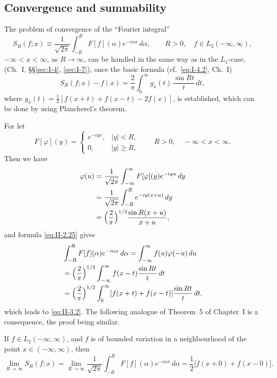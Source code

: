 \subsection*{Convergence and summability}
\noindent The problem of convergence of the ``Fourier integral''
\begin{equation}\tag{3.1}\label{eq:II-3.1}
S_{R}(f;x)\equiv \frac{1}{\sqrt{2\pi}}\int_{-R}^{R}F[f](\alpha)e^{-i\alpha x}\,d\alpha,\qquad R>0,\quad f\in L_{2}(-\infty,\infty),
\end{equation}
$-\infty<x<\infty$, as $R\to\infty$, can be handled in the same way as in the $L_{1}$-case, (Ch.~I, \S\S\ref{sec:I-4}, \ref{sec:I-7}), once the basic formula (cf.\ \eqref{eq:I-4.2}, Ch.~I)
\begin{equation}\tag{3.2}\label{eq:II-3.2}
S_{R}(f;x)-f(x)=\frac{2}{\pi}\int_{0}^{\infty}g_{x}(t)\,\frac{\sin Rt}{t}\,dt,
\end{equation}
where $g_{x}(t)=\frac{1}{2}[f(x+t)+f(x-t)-2f(x)]$, is established, which can be done by using Plancherel's theorem.

For let
\[
F[\varphi](y)=
\begin{cases}
e^{-iyx}, & |y|<R,\\
0, & |y|\ge R,
\end{cases}
\qquad R>0,\quad -\infty<x<\infty.
\]
Then we have
\[
\begin{aligned}
\varphi(u) &= \frac{1}{\sqrt{2\pi}}\int_{-\infty}^{\infty}F[\varphi](y)e^{-iyu}\,dy\\
&= \frac{1}{\sqrt{2\pi}}\int_{-R}^{R}e^{-iy(x+u)}\,dy\\
&= \Bigl(\frac{2}{\pi}\Bigr)^{1/2}\frac{\sin R(x+u)}{x+u},
\end{aligned}
\]
and formula \eqref{eq:II-2.25} gives
\[
\begin{aligned}
&\int_{-R}^{R}F[f](\alpha)e^{-i\alpha x}\,d\alpha = \int_{-\infty}^{\infty}f(u)\varphi(-u)\,du\\
&= \Bigl(\frac{2}{\pi}\Bigr)^{1/2}\int_{-\infty}^{\infty}f(x-t)\frac{\sin Rt}{t}\,dt\\
&= \Bigl(\frac{2}{\pi}\Bigr)^{1/2}\int_{0}^{\infty}[f(x+t)+f(x-t)]\frac{\sin Rt}{t}\,dt,
\end{aligned}
\]
which leads to \eqref{eq:II-3.2}. The following analogue of Theorem~5 of Chapter~I is a consequence, the proof being similar.

\begin{theorem}\label{thm:II-2}
If $f\in L_{2}(-\infty,\infty)$, and $f$ is of bounded variation in a neighbourhood of the point $x\in(-\infty,\infty)$, then
\[
\lim_{R\to\infty}S_{R}(f;x)
=\lim_{R\to\infty}\frac{1}{\sqrt{2\pi}}\int_{-R}^{R}F[f](\alpha)e^{-i\alpha x}\,d\alpha
=\frac{1}{2}\bigl[f(x+0)+f(x-0)\bigr].
\]
\end{theorem}

